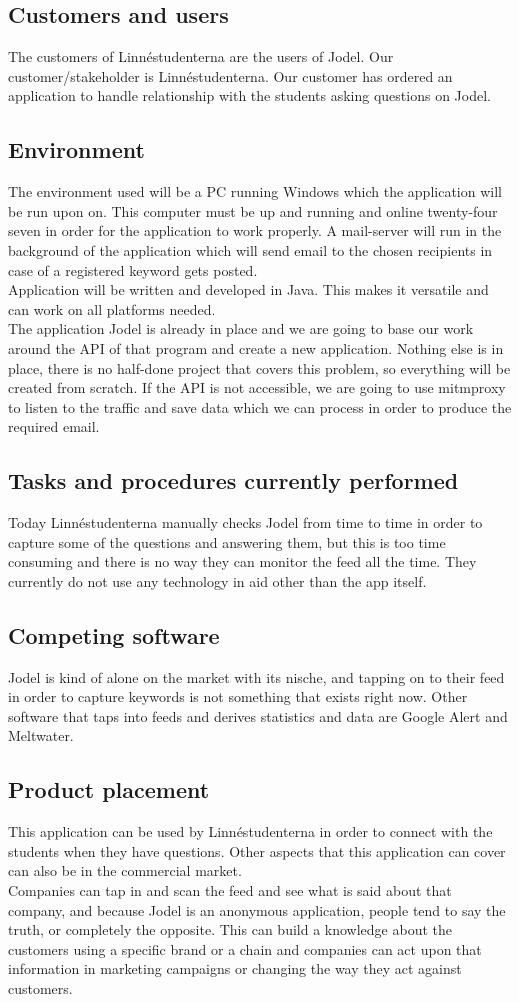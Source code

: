 \documentclass[a4paper,12pt]{article}
\begin{document}
\subsection{Customers and users}
The customers of Linnéstudenterna are the users of Jodel. Our customer/stakeholder is Linnéstudenterna. Our customer has ordered an application to handle relationship with the students asking questions on Jodel.
\subsection{Environment}
The environment used will be a PC running Windows which the application will be run upon on. This computer must be up and running and online twenty-four seven in order for the application to work properly. A mail-server will run in the background of the application which will send email to the chosen recipients in case of a registered keyword gets posted.\\
Application will be written and developed in Java. This makes it versatile and can work on all platforms needed.
\\The application Jodel is already in place and we are going to base our work around the API of that program and create a new application. Nothing else is in place, there is no half-done project that covers this problem, so everything will be created from scratch.
If the API is not accessible, we are going to use mitmproxy to listen to the traffic and save data which we can process in order to produce the required email.
\subsection{Tasks and procedures currently performed}
Today Linnéstudenterna manually checks Jodel from time to time in order to capture some of the questions and answering them, but this is too time consuming and there is no way they can monitor the feed all the time. They currently do not use any technology in aid other than the app itself.
\subsection{Competing software}
Jodel is kind of alone on the market with its nische, and tapping on to their feed in order to capture keywords is not something that exists right now.
Other software that taps into feeds and derives statistics and data are Google Alert and Meltwater.
\subsection{Product placement}
This application can be used by Linnéstudenterna in order to connect with the students when they have questions. Other aspects that this application can cover can also be in the commercial market. \\
Companies can tap in and scan the feed and see what is said about that company, and because Jodel is an anonymous application, people tend to say the truth, or completely the opposite. This can build a knowledge about the customers using a specific brand or a chain and companies can act upon that information in marketing campaigns or changing the way they act against customers.
\end{document}
